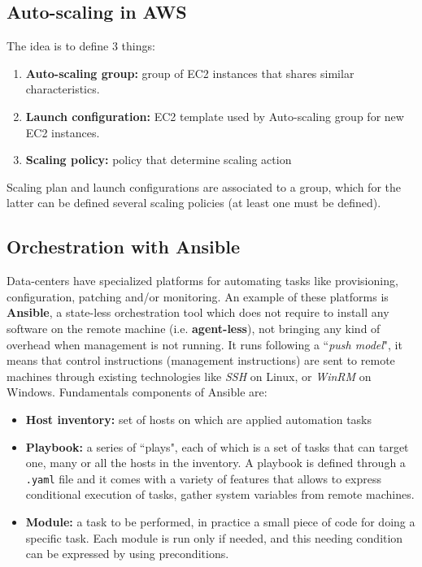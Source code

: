 \documentclass{article}
\begin{document}
\subsection{Auto-scaling in AWS}
The idea is to define 3 things:
\begin{enumerate}
    \item \textbf{Auto-scaling group:} group of EC2 instances that shares similar characteristics.
    \item \textbf{Launch configuration:} EC2 template used by Auto-scaling group for new EC2 instances.
    \item \textbf{Scaling policy:} policy that determine scaling action
\end{enumerate}
Scaling plan and launch configurations are associated to a group, which for the latter can be defined several scaling policies (at least one must be defined).

\subsection{Orchestration with Ansible}
Data-centers have specialized platforms for automating tasks like provisioning, configuration, patching and/or monitoring. An example of these platforms is \textbf{Ansible}, a state-less orchestration tool which does not require to install any software on the remote machine (i.e. \textbf{agent-less}), not bringing any kind of overhead when management is not running. It runs following a ``\textit{push model}", it means that control instructions (management instructions) are sent to remote machines through existing technologies like \textit{SSH} on Linux, or \textit{WinRM} on Windows. Fundamentals components of Ansible are:
\begin{itemize}
    \item \textbf{Host inventory:} set of hosts on which are applied automation tasks
    \item \textbf{Playbook:} a series of ``plays", each of which is a set of tasks that can target one, many or all the hosts in the inventory. A playbook is defined through a \texttt{.yaml} file and it comes with a variety of features that allows to express conditional execution of tasks, gather system variables from remote machines.
    \item \textbf{Module:} a task to be performed, in practice a small piece of code for doing a specific task. Each module is run only if needed, and this needing condition can be expressed by using preconditions.
\end{itemize}
\end{document}
